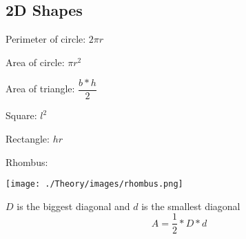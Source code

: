 \subsection{2D Shapes}


Perimeter of circle: $ 2 \pi r $

Area of circle: $ \pi r^2 $

Area of triangle: $ \dfrac{b * h}{2} $

Square: $ l^2 $

Rectangle: $ hr $

Rhombus:
\begin{center}
    \texttt{[image: ./Theory/images/rhombus.png]}
\end{center}
$D$ is the biggest diagonal and $d$ is the smallest diagonal
$$ A = \dfrac{1}{2} * D * d $$